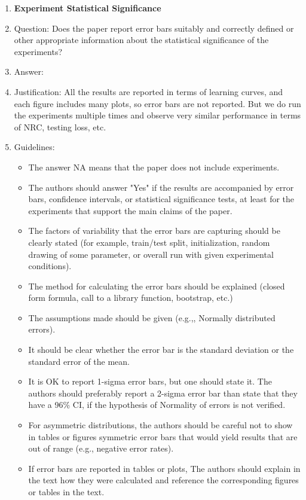 \documentclass{article}
\theoremstyle{plain}
\theoremstyle{definition}
\theoremstyle{remark}
\begin{document}
\begin{enumerate}
\item {\bf Experiment Statistical Significance}
    \item[] Question: Does the paper report error bars suitably and correctly defined or other appropriate information about the statistical significance of the experiments?
    \item[] Answer: \answerNo{} %
    \item[] Justification: All the results are reported in terms of learning curves, and each figure includes many plots, so error bars are not reported. But we do run the experiments multiple times and observe very similar performance in terms of NRC, testing loss, etc.
    \item[] Guidelines:
    \begin{itemize}
        \item The answer NA means that the paper does not include experiments.
        \item The authors should answer "Yes" if the results are accompanied by error bars, confidence intervals, or statistical significance tests, at least for the experiments that support the main claims of the paper.
        \item The factors of variability that the error bars are capturing should be clearly stated (for example, train/test split, initialization, random drawing of some parameter, or overall run with given experimental conditions).
        \item The method for calculating the error bars should be explained (closed form formula, call to a library function, bootstrap, etc.)
        \item The assumptions made should be given (e.g.,, Normally distributed errors).
        \item It should be clear whether the error bar is the standard deviation or the standard error of the mean.
        \item It is OK to report 1-sigma error bars, but one should state it. The authors should preferably report a 2-sigma error bar than state that they have a 96\% CI, if the hypothesis of Normality of errors is not verified.
        \item For asymmetric distributions, the authors should be careful not to show in tables or figures symmetric error bars that would yield results that are out of range (e.g., negative error rates).
        \item If error bars are reported in tables or plots, The authors should explain in the text how they were calculated and reference the corresponding figures or tables in the text.
    \end{itemize}


\end{enumerate}
\end{document}
